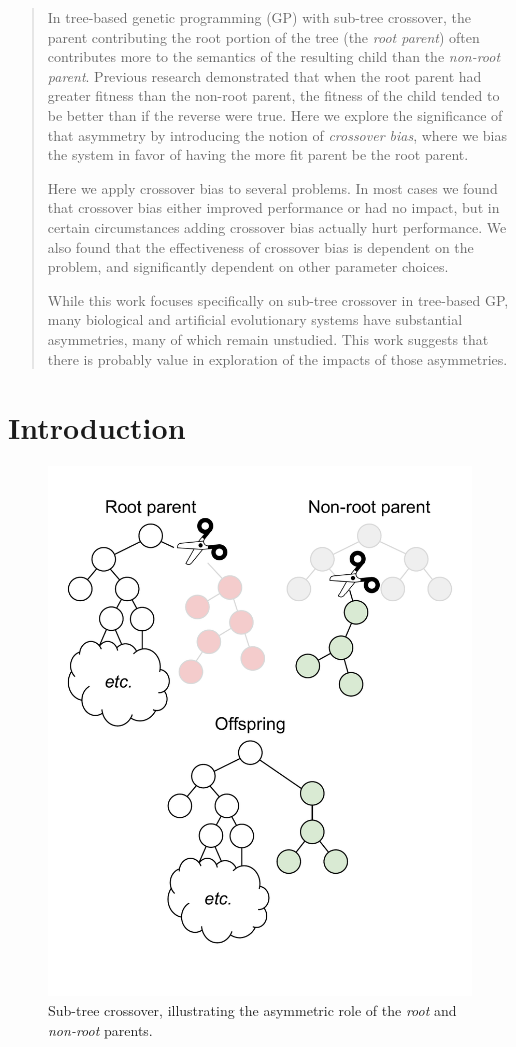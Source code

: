\documentclass{sig-alternate}
\begin{document}
\begin{abstract}

In tree-based genetic programming (GP) with sub-tree crossover, the parent contributing the root portion of the tree
(the \emph{root parent}) often contributes more to the semantics of the resulting child than the \emph{non-root
parent}. Previous research demonstrated that when the root parent had greater fitness than the non-root parent, the
fitness of the child tended to be better than if the reverse were true. Here we explore the significance of that
asymmetry by introducing the notion of \emph{crossover bias}, where we bias the system in favor of having the more fit
parent be the root parent.

Here we apply crossover bias to several problems. In most cases we found that crossover bias either improved
performance or had no impact, but in certain circumstances adding crossover bias actually hurt performance. We also
found that the effectiveness of crossover bias is dependent on the problem, and significantly dependent on other
parameter choices.

While this work focuses specifically on sub-tree crossover in tree-based GP, many biological and artificial
evolutionary systems have substantial asymmetries, many of which remain unstudied. This work suggests that there is
probably value in exploration of the impacts of those asymmetries.

\end{abstract}


\pagebreak

\section{Introduction} \label{sec:Introduction}

\begin{figure}
	\centering
	\includegraphics[width=0.45 \textwidth]{Plots/Root_parent_illustration_no_triangle.pdf}
	\caption{Sub-tree crossover, illustrating the asymmetric role of the \emph{root} and \emph{non-root} parents.}
	\label{fig:root_parent_illustration}
\end{figure}
\end{document}
